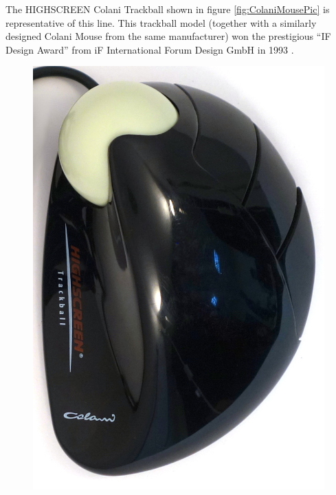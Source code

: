 \documentclass[11pt, a4paper]{article}
\begin{document}
The HIGHSCREEN Colani Trackball shown in figure \ref{fig:ColaniMousePic} is representative of this line. This trackball model (together with a similarly designed Colani Mouse from the same manufacturer) won the prestigious “IF Design Award” from iF International Forum Design GmbH in 1993 \cite{award}.

\begin{figure}[h]
    \centering
    \includegraphics[scale=0.5]{1993_colani_trackball/top_b_30.jpg}

\end{figure}
\end{document}
